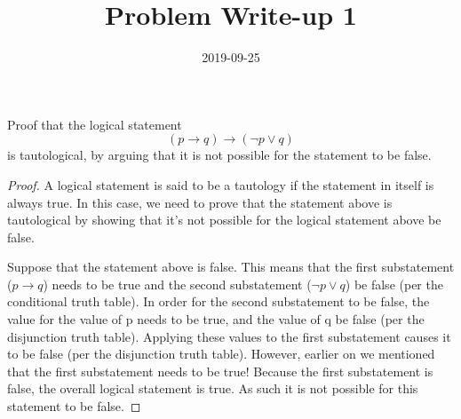 \documentclass[a4paper,12pt]{article}
\title{Problem Write-up 1}
\date{2019-09-25}
\begin{document}
\begin{prob}
    Proof that the logical statement \[(p \to q) \to (\neg p \vee q)\] is tautological, by arguing that it is not possible for the statement to be false.
\end{prob}

\begin{proof}
   A logical statement is said to be a tautology if the statement in itself is always true. In this case, we need to prove that the statement above is tautological by showing that it's not possible for the logical statement above be false.

   Suppose that the statement above is false. This means that the first substatement (\(p \to q\)) needs to be true and the second substatement (\(\neg p \vee q\)) be false (per the conditional truth table). In order for the second substatement to be false, the value for the value of p needs to be true, and the value of q be false (per the disjunction truth table). Applying these values to the first substatement causes it to be false (per the disjunction truth table). However, earlier on we mentioned that the first substatement needs to be true! Because the first substatement is false, the overall logical statement is true. As such it is not possible for this statement to be false.
\end{proof}
\end{document}
